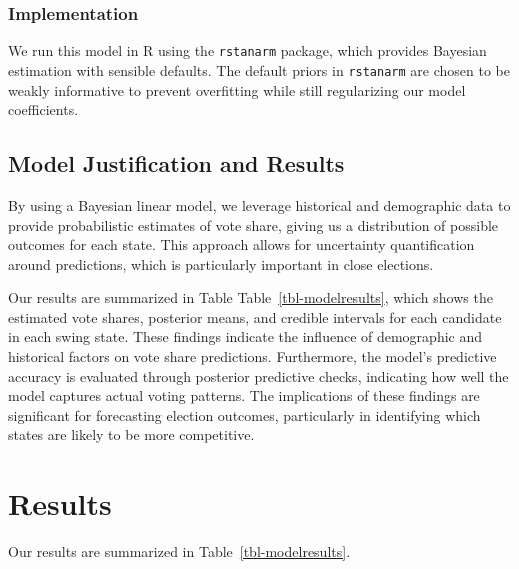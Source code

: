 \documentclass[
  letterpaper,
  DIV=11,
  numbers=noendperiod]{scrartcl}
\begin{document}
\subsubsection{Implementation}\label{implementation}

We run this model in R using the \texttt{rstanarm} package, which
provides Bayesian estimation with sensible defaults. The default priors
in \texttt{rstanarm} are chosen to be weakly informative to prevent
overfitting while still regularizing our model coefficients.

\subsection{Model Justification and
Results}\label{model-justification-and-results}

By using a Bayesian linear model, we leverage historical and demographic
data to provide probabilistic estimates of vote share, giving us a
distribution of possible outcomes for each state. This approach allows
for uncertainty quantification around predictions, which is particularly
important in close elections.

Our results are summarized in Table Table~\ref{tbl-modelresults}, which
shows the estimated vote shares, posterior means, and credible intervals
for each candidate in each swing state. These findings indicate the
influence of demographic and historical factors on vote share
predictions. Furthermore, the model's predictive accuracy is evaluated
through posterior predictive checks, indicating how well the model
captures actual voting patterns. The implications of these findings are
significant for forecasting election outcomes, particularly in
identifying which states are likely to be more competitive.

\section{Results}\label{sec-results}

Our results are summarized in Table~\ref{tbl-modelresults}.
\end{document}
